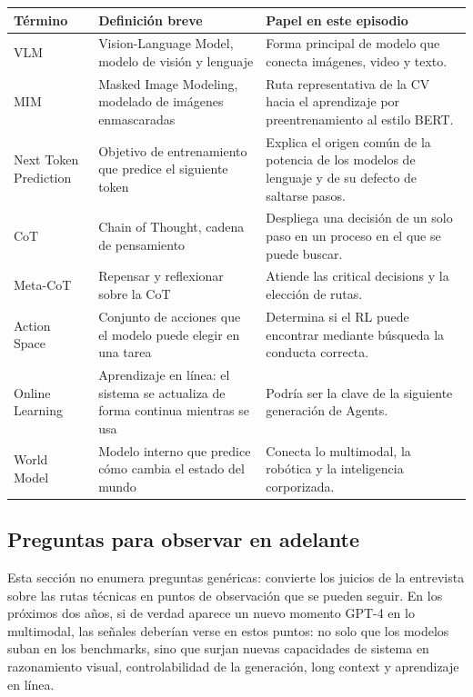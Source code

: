 \documentclass[a4paper]{article}
\begin{document}
\noindent\begin{tabularx}{\textwidth}{p{}p{}X}
\toprule
Término & Definición breve & Papel en este episodio \\
\midrule
VLM & Vision-Language Model, modelo de visión y lenguaje & Forma principal de modelo que conecta imágenes, video y texto. \\
MIM & Masked Image Modeling, modelado de imágenes enmascaradas & Ruta representativa de la CV hacia el aprendizaje por preentrenamiento al estilo BERT. \\
Next Token Prediction & Objetivo de entrenamiento que predice el siguiente token & Explica el origen común de la potencia de los modelos de lenguaje y de su defecto de saltarse pasos. \\
CoT & Chain of Thought, cadena de pensamiento & Despliega una decisión de un solo paso en un proceso en el que se puede buscar. \\
Meta-CoT & Repensar y reflexionar sobre la CoT & Atiende las critical decisions y la elección de rutas. \\
Action Space & Conjunto de acciones que el modelo puede elegir en una tarea & Determina si el RL puede encontrar mediante búsqueda la conducta correcta. \\
Online Learning & Aprendizaje en línea: el sistema se actualiza de forma continua mientras se usa & Podría ser la clave de la siguiente generación de Agents. \\
World Model & Modelo interno que predice cómo cambia el estado del mundo & Conecta lo multimodal, la robótica y la inteligencia corporizada. \\
\bottomrule
\end{tabularx}

\subsection{Preguntas para observar en adelante}

Esta sección no enumera preguntas genéricas: convierte los juicios de la entrevista sobre las rutas técnicas en puntos de observación que se pueden seguir. En los próximos dos años, si de verdad aparece un nuevo momento GPT-4 en lo multimodal, las señales deberían verse en estos puntos: no solo que los modelos suban en los benchmarks, sino que surjan nuevas capacidades de sistema en razonamiento visual, controlabilidad de la generación, long context y aprendizaje en línea.
\end{document}
